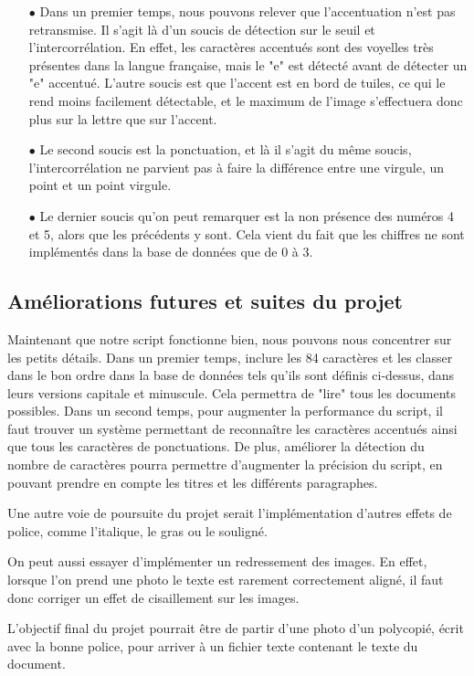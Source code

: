 \documentclass[a4paper,12pt,titlepage]{report}
\begin{document}
	\begin{itemize}
		\item[$\bullet$] Dans un premier temps, nous pouvons relever que l'accentuation n'est pas retransmise. Il s'agit là d'un soucis de détection sur le seuil et l'intercorrélation. En effet, les caractères accentués sont des voyelles très présentes dans la langue française, mais le "e" est détecté avant de détecter un "e" accentué. L'autre soucis est que l'accent est en bord de tuiles, ce qui le rend moins facilement détectable, et le maximum de l'image s'effectuera donc plus sur la lettre que sur l'accent.
		\item[$\bullet$] Le second soucis est la ponctuation, et là il s'agit du même soucis, l'intercorrélation ne parvient pas à faire la différence entre une virgule, un point et un point virgule.
		\item[$\bullet$] Le dernier soucis qu'on peut remarquer est la non présence des numéros 4 et 5, alors que les précédents y sont. Cela vient du fait que les chiffres ne sont implémentés dans la base de données que de 0 à 3.
	\end{itemize}
	
	\subsection{Améliorations futures et suites du projet}	
	Maintenant que notre script fonctionne bien, nous pouvons nous concentrer sur les petits détails. Dans un premier temps, inclure les 84 caractères et les classer dans le bon ordre dans la base de données tels qu'ils sont définis ci-dessus, dans leurs versions capitale et minuscule. Cela permettra de "lire" tous les documents possibles. Dans un second temps, pour augmenter la performance du script, il faut trouver un système permettant de reconnaître les caractères accentués ainsi que tous les caractères de ponctuations. De plus, améliorer la détection du nombre de caractères pourra permettre d'augmenter la précision du script, en pouvant prendre en compte les titres et les différents paragraphes.
	
	Une autre voie de poursuite du projet serait l'implémentation d'autres effets de police, comme l'italique, le gras ou le souligné.
	
	On peut aussi essayer d'implémenter un redressement des images. En effet, lorsque l'on prend une photo le texte est rarement correctement aligné, il faut donc corriger un effet de cisaillement sur les images.
	
	L'objectif final du projet pourrait être de partir d'une photo d'un polycopié, écrit avec la bonne police, pour arriver à un fichier texte contenant le texte du document.
\end{document}
